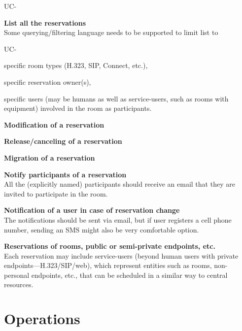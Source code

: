 \documentclass[a4paper]{report}
\makeatletter
\newcounter{UCcounter}
\newenvironment{UseCases}%
	{\begin{list}{UC-\arabic{UCcounter}}{\@nmbrlisttrue\def\@listctr{UCcounter}}}%
	{\end{list}}
\newcommand{\UClabel}[1]{\label{UC:#1}}
\newcommand{\UseCase}[2]{\item\UClabel{#2} \textbf{#1}\\}
\makeatother
\begin{document}
\begin{UseCases}
\UseCase{List all the reservations}{rsv:list}

Some querying/filtering language needs to be supported to limit list to

\begin{UseCases}

\item specific room types (H.323, SIP, Connect, etc.),

\item specific reservation owner(s),

\item specific users (may be humans as well as service-users, such as rooms
with equipment) involved in the room as participants.

\end{UseCases}

\UseCase{Modification of a reservation}{rsv:modify}

\UseCase{Release/canceling of a reservation}{rsv:release}

\UseCase{Migration of a reservation}{rsv:migration}

\UseCase{Notify participants of a reservation}{rsv:notify-rsv}

All the (explicitly named) participants should receive an email that they are invited to participate in the room.

\UseCase{Notification of a user in case of reservation
change}{rsv:notify-change}

The notifications should be sent via email, but if user registers a cell phone
number, sending an SMS might also be very comfortable option.

\UseCase{Reservations of rooms, public or semi-private endpoints,
etc.}{rsv:service-users}

Each reservation may include service-users (beyond human users with private
endpoints---H.323/SIP/web), which represent entities such as rooms,
non-personal endpoints, etc., that can be scheduled in a similar way to central
resources.

\end{UseCases}


\section{Operations}
\end{document}
